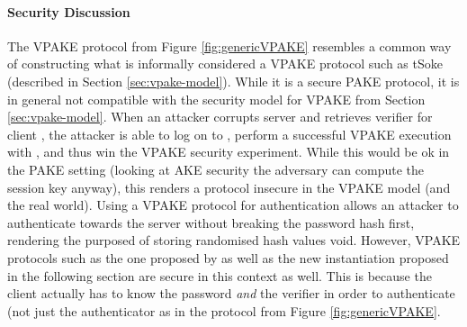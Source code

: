 \paragraph{Security Discussion}
The \ac{VPAKE} protocol from Figure \ref{fig:genericVPAKE} resembles a common way of constructing what is informally considered a \ac{VPAKE} protocol such as tSoke (described in Section \ref{sec:vpake-model}).
While it is a secure \ac{PAKE} protocol, it is in general not compatible with the security model for \ac{VPAKE} from Section \ref{sec:vpake-model}.
When an attacker corrupts server \Server and retrieves verifier \ver for client \Client, the attacker is able to log on to \Server, \ie perform a successful \ac{VPAKE} execution with \Server, and thus win the \ac{VPAKE} security experiment.
While this would be ok in the \ac{PAKE} setting (looking at \ac{AKE} security the adversary can compute the session key anyway), this renders a protocol insecure in the \ac{VPAKE} model (and the real world).
Using a \ac{VPAKE} protocol for authentication allows an attacker to authenticate towards the server without breaking the password hash first, \ie rendering the purposed of storing randomised hash values void.
However, \ac{VPAKE} protocols such as the one proposed by \citet{BenhamoudaP13} as well as the new instantiation proposed in the following section are secure in this context as well.
This is because the client actually has to know the password \emph{and} the verifier in order to authenticate (not just the authenticator as in the protocol from Figure \ref{fig:genericVPAKE}.

